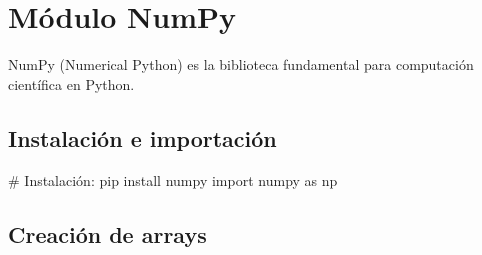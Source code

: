 \documentclass[
  doc,
  floatsintext,
  longtable,
  a4paper,
  nolmodern,
  notxfonts,
  notimes,
  12pt,
  colorlinks=true,linkcolor=blue,citecolor=blue,urlcolor=blue]{apa7}
\newenvironment{Shaded}{\begin{snugshade}}{\end{snugshade}}
\newcommand{\CommentTok}[1]{\textcolor[rgb]{0.37,0.37,0.37}{#1}}
\newcommand{\ImportTok}[1]{\textcolor[rgb]{0.00,0.46,0.62}{#1}}
\newcommand{\NormalTok}[1]{\textcolor[rgb]{0.00,0.23,0.31}{#1}}
\begin{document}
\section{Módulo NumPy}\label{muxf3dulo-numpy}

NumPy (Numerical Python) es la biblioteca fundamental para computación
científica en Python.

\subsection{Instalación e
importación}\label{instalaciuxf3n-e-importaciuxf3n}

\begin{Shaded}
\begin{Highlighting}[]
\CommentTok{\# Instalación: pip install numpy}
\ImportTok{import}\NormalTok{ numpy }\ImportTok{as}\NormalTok{ np}
\end{Highlighting}
\end{Shaded}

\subsection{Creación de arrays}\label{creaciuxf3n-de-arrays}
\end{document}
